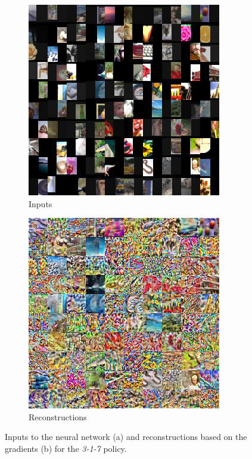 \begin{figure}[hbt!]
\begin{subfigure}{.49\linewidth}\centering
\includegraphics[width=\textwidth]{grids/data_cifar100_arch_ResNet20-4_epoch_200_optim_inversed_mode_aug_auglist_3-1-7_rlabel_False_ORIGINALS.png}
\caption{Inputs}%
\end{subfigure}%
\hfill
\begin{subfigure}{.49\linewidth}\centering
\includegraphics[width=\textwidth]{grids/data_cifar100_arch_ResNet20-4_epoch_200_optim_inversed_mode_aug_auglist_3-1-7_rlabel_False_RECONSTRUCTIONS.png}
\caption{Reconstructions}%
\end{subfigure}%
\caption{Inputs to the neural network (a) and reconstructions based on the gradients (b) for the \textit{3-1-7} policy.}
    \label{fig:apprr2}
\end{figure}

